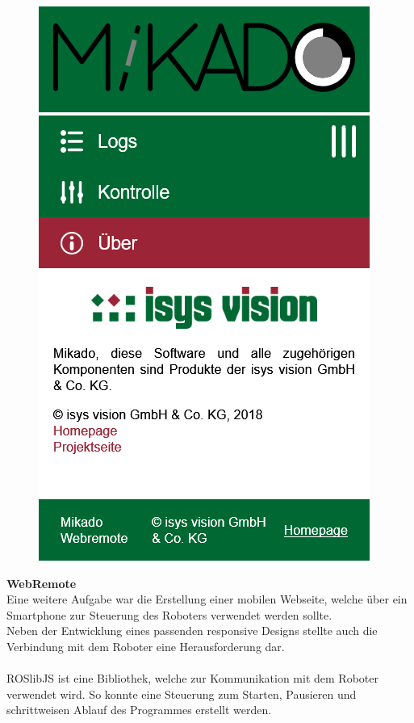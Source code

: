 \documentclass[a1,landscape]{a0poster}
\newenvironment{block}{\begin{mdframed}[roundcorner=25pt,innerleftmargin=40pt,innertopmargin=40pt,innerrightmargin=40pt,innerbottommargin=40pt,backgroundcolor=color_SoftBlue,linecolor=color_SoftBlue]}{\end{mdframed}}
\begin{document}
\begin{textblock*}{2100pt}
\begin{multicols}{2}
\begin{block}
\begin{figure}
				\includegraphics[width=\linewidth]{media/webremote-info.png}
			\end{figure}
			\textbf{WebRemote}\\
			Eine weitere Aufgabe war die Erstellung einer mobilen Webseite, welche über ein Smartphone zur Steuerung des Roboters verwendet werden sollte.\\
			Neben der Entwicklung eines passenden responsive Designs stellte auch die Verbindung mit dem Roboter eine Herausforderung dar.\\\\
			ROSlibJS ist eine Bibliothek, welche zur Kommunikation mit dem Roboter verwendet wird. So konnte eine Steuerung zum Starten, Pausieren und schrittweisen Ablauf des Programmes erstellt werden.
		\end{block}
	\end{multicols}
\end{textblock*}
\end{document}
